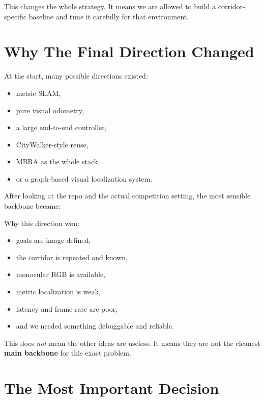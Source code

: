\documentclass[11pt,a4paper]{article}
\begin{document}
This changes the whole strategy.  It means we are allowed to build a
corridor-specific baseline and tune it carefully for that environment.


\section{Why The Final Direction Changed}

At the start, many possible directions existed:

\begin{itemize}[nosep]
  \item metric SLAM,
  \item pure visual odometry,
  \item a large end-to-end controller,
  \item CityWalker-style reuse,
  \item MBRA as the whole stack,
  \item or a graph-based visual localization system.
\end{itemize}

After looking at the repo and the actual competition setting, the most sensible
backbone became:

\begin{center}
\end{center}

Why this direction won:

\begin{itemize}[nosep]
  \item goals are image-defined,
  \item the corridor is repeated and known,
  \item monocular RGB is available,
  \item metric localization is weak,
  \item latency and frame rate are poor,
  \item and we needed something debuggable and reliable.
\end{itemize}

This does \emph{not} mean the other ideas are useless.  It means they are not
the cleanest \textbf{main backbone} for this exact problem.


\section{The Most Important Decision}
\end{document}
